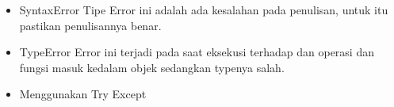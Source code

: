 \begin{enumerate}
\begin{itemize}
\item SyntaxError
Tipe Error ini adalah ada kesalahan pada penulisan, untuk itu pastikan penulisannya benar.\\

\item TypeError
Error ini terjadi pada saat eksekusi terhadap dan operasi dan fungsi masuk kedalam objek sedangkan typenya salah.\\

\item Menggunakan Try Except \\


\end{itemize}

\end{enumerate}

